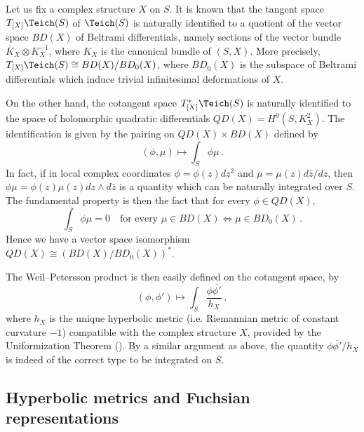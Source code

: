 Let us fix a complex structure $X$ on $S$. It is known that the tangent space $T_{[X]}\Teich(S)$ of $\Teich(S)$ is naturally identified to a quotient of the vector space $BD(X)$ of Beltrami differentials, namely sections of the vector bundle $\overline K_X\otimes K_X^{-1}$, where $K_X$ is the canonical bundle of $(S,X)$. More precisely, $T_{[X]}\Teich(S)\cong BD(X)/BD_0(X)$, where $BD_0(X)$ is the subspace of Beltrami differentials which induce trivial infinitesimal deformations of $X$.

On the other hand, the cotangent space $T^*_{[X]}\Teich(S)$ is naturally identified to the space of holomorphic quadratic differentials $QD(X)=H^0(S,K_X^2)$. The identification is given by the pairing on $QD(X)\times BD(X)$ defined by
\[
(\phi,\mu)\mapsto\int_S \phi\mu\,.
\]
In fact, if in local complex coordinates $\phi=\phi(z)dz^2$ and $\mu=\mu(z)d\bar z/dz$, then $\phi\mu=\phi(z)\mu(z)dz\wedge d\bar z$ is a quantity which can be naturally integrated over $S$. The fundamental property is then the fact that for every $\phi\in QD(X)$,
\[
\int_S \phi\mu=0\quad\text{for every }\mu\in BD(X)\Leftrightarrow \mu\in BD_0(X)\,.
\]
Hence we have a vector space isomorphism $QD(X)\cong (BD(X)/BD_0(X))^*$.

The Weil--Petersson product is then easily defined on the cotangent space, by
\[
(\phi,\phi')\mapsto \int_S \frac{\phi\overline{\phi'}}{h_X}\,,
\]
where $h_X$ is the unique hyperbolic metric (i.e. Riemannian metric of constant curvature $-1$) compatible with the complex structure $X$, provided by the Uniformization Theorem (\cite{koebeunif}). By a similar argument as above, the quantity $\phi\overline{\phi'}/h_X$ is indeed of the correct type to be integrated on $S$.



\subsection*{Hyperbolic metrics and Fuchsian representations}

